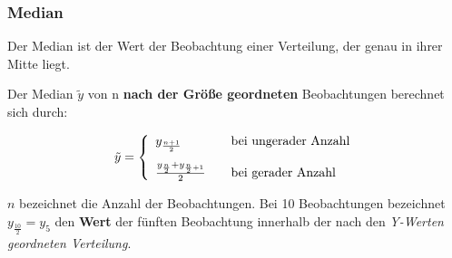 \begin{frame}
\frametitle{Median}
Der Median ist der Wert der Beobachtung einer Verteilung, der genau in ihrer Mitte liegt. 

Der Median $\tilde{y}$ von n \textbf{nach der Größe geordneten} Beobachtungen berechnet sich durch: 

\begin{equation}
  \tilde{y} = \left\{  
\begin{array}{l l}
 y_{\frac{n+1}{2}} \quad & \text{bei ungerader Anzahl}\\[1em]
 \frac{y_\frac{n}{2} + y_{\frac{n}{2}+1}}{2} \quad & \text{bei gerader Anzahl}\\
 \end{array} \right.
\end{equation}

$n$ bezeichnet die Anzahl der Beobachtungen. Bei 10 Beobachtungen bezeichnet $y_\frac{10}{2} = y_5 $ den \textbf{Wert} der fünften Beobachtung innerhalb der nach den \textit{Y-Werten geordneten Verteilung}. 

\end{frame}
